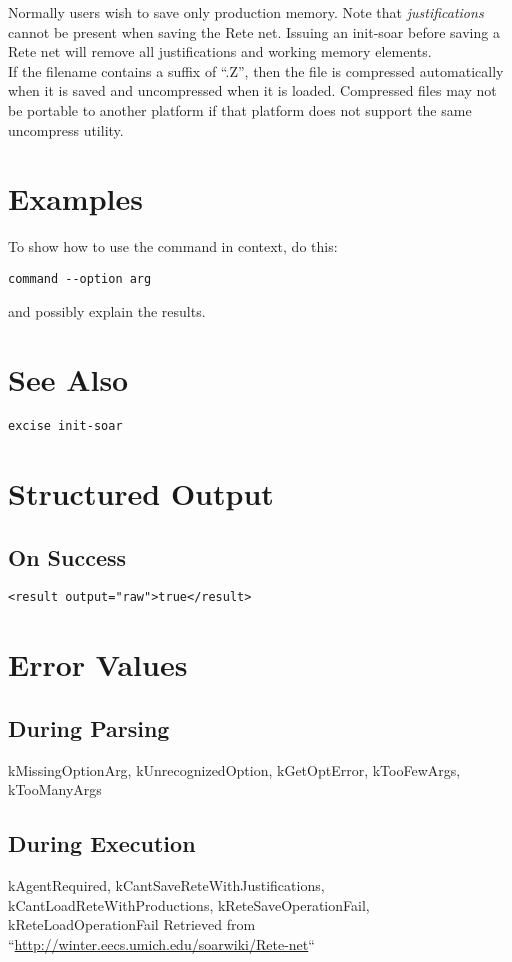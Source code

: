 \documentclass[10pt]{article}
\begin{document}
  Normally users wish to save only production memory. Note that \emph{justifications}
 cannot be present when saving the Rete net. Issuing an init-soar before saving a Rete net will remove all justifications and working memory elements. \\ 
 If the filename contains a suffix of ``.Z'', then the file is compressed automatically when it is saved and uncompressed when it is loaded. Compressed files may not be portable to another platform if that platform does not support the same uncompress utility. 
\section*{ Examples }


 To show how to use the command in context, do this: \begin{verbatim}
command --option arg

\end{verbatim}



 and possibly explain the results. 
\section*{ See Also }
\begin{verbatim}
excise init-soar 

\end{verbatim}
\section*{ Structured Output }
\subsection*{ On Success }
\begin{verbatim}
<result output="raw">true</result>

\end{verbatim}
\section*{ Error Values }
\subsection*{ During Parsing }


 kMissingOptionArg, kUnrecognizedOption, kGetOptError, kTooFewArgs, kTooManyArgs
\subsection*{ During Execution }
kAgentRequired, kCantSaveReteWithJustifications, kCantLoadReteWithProductions, kReteSaveOperationFail, kReteLoadOperationFail Retrieved from ``\url{http://winter.eecs.umich.edu/soarwiki/Rete-net}``
\end{document}
